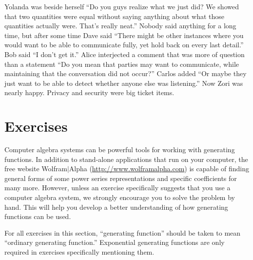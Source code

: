 Yolanda was beside herself ``Do you guys realize what we just
did?  We showed that two quantities were equal without saying
anything about what those quantities actually were.  That's really
neat.''  Nobody said anything for a long time, but after some time
Dave said ``There might be other instances where you would
want to be able to communicate fully, yet hold back on every
last detail.''  Bob said ``I don't get it.''  Alice interjected
a comment that was more of question than a statement ``Do you
mean that parties may want to communicate, while maintaining
that the conversation did not occur?''  Carlos added ``Or maybe
they just want to be able to detect whether anyone else was
listening.''  Now Zori was nearly happy.  Privacy and security were
big ticket items.

\section{Exercises}\label{s:genfunction:exercises}

Computer algebra systems can be powerful tools for working with
generating functions. In addition to stand-alone applications that run
on your computer, the free website Wolfram$|$Alpha
(\url{http://www.wolframalpha.com}) is capable of finding general
forms of some power series representations and specific coefficients
for many more. However, unless an exercise specifically suggests that
you use a computer algebra system, we strongly encourage you to solve
the problem by hand. This will help you develop a better understanding
of how generating functions can be used.

For all exercises in this section, ``generating function'' should be
taken to mean ``ordinary generating function.'' Exponential generating
functions are only required in exercises specifically mentioning them.

